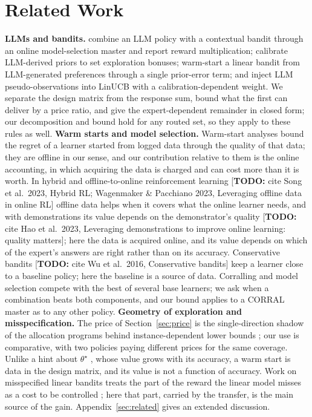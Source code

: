 \documentclass{article}
\theoremstyle{definition}
\theoremstyle{remark}
\theoremstyle{remark}
\newcommand{\todo}[1]{\textcolor{red!70!black}{[\textbf{TODO:} #1]}}
\begin{document}
\section{Related Work}
\label{sec:related-main}

\textbf{LLMs and bandits.} \cite{chen2024llmdecision} combine an LLM policy
with a contextual bandit through an online model-selection master and report
reward multiplication; \cite{huangcontextual} calibrate LLM-derived priors to
set exploration bonuses; \cite{jumpstart2026} warm-start a linear bandit from
LLM-generated preferences through a single prior-error term; and
\cite{calibgated2026} inject LLM pseudo-observations into LinUCB with a
calibration-dependent weight. We separate the design matrix from the response
sum, bound what the first can deliver by a price ratio, and give the
expert-dependent remainder in closed form; our decomposition and bound hold
for any routed set, so they apply to these rules as well.
\textbf{Warm starts and model selection.} Warm-start analyses
\cite{bastani2021mostly,zhang2019warm} bound the regret of a learner started
from logged data through the quality of that data; they are offline in our
sense, and our contribution relative to them is the online accounting, in
which acquiring the data is charged and can cost more than it is worth. In
hybrid and offline-to-online reinforcement learning
\todo{cite Song et al.\ 2023, Hybrid RL; Wagenmaker \& Pacchiano 2023,
Leveraging offline data in online RL} offline data helps when it covers what
the online learner needs, and with demonstrations its value depends on the
demonstrator's quality \todo{cite Hao et al.\ 2023, Leveraging demonstrations
to improve online learning: quality matters}; here the data is acquired
online, and its value depends on which of the expert's answers are right
rather than on its accuracy. Conservative bandits \todo{cite Wu et al.\ 2016,
Conservative bandits} keep a learner close to a baseline policy; here the
baseline is a source of data.
Corralling and model selection
\cite{agarwal2017corralling,pacchiano2020model,marinov2021pareto} compete
with the best of several base learners; we ask when a combination beats both
components, and our bound applies to a CORRAL master as to any other policy.
\textbf{Geometry of exploration and misspecification.} The price of
Section~\ref{sec:price} is the single-direction shadow of the allocation
programs behind instance-dependent lower bounds
\cite{graves1997asymptotically,lattimore2017end}; our use is comparative,
with two policies paying different prices for the same coverage. Unlike a
hint about $\theta^\star$ \cite{cutkosky2022leveraging}, whose value grows
with its accuracy, a warm start is data in the design matrix, and its value
is not a function of accuracy. Work on misspecified linear bandits treats the
part of the reward the linear model misses as a cost to be controlled
\cite{ghosh2017misspecified,lattimore2020learning,foster2020adapting}; here that part, carried by the transfer,
is the main source of the gain. Appendix~\ref{sec:related} gives an extended
discussion.
\end{document}
